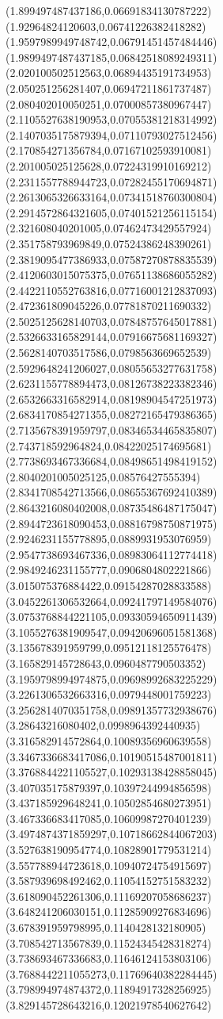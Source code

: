 {(1.899497487437186,0.06691834130787222)
(1.92964824120603,0.06741226382418282)
(1.9597989949748742,0.06791451457484446)
(1.9899497487437185,0.06842518089249311)
(2.020100502512563,0.06894435191734953)
(2.050251256281407,0.06947211861737487)
(2.080402010050251,0.07000857380967447)
(2.1105527638190953,0.07055381218314992)
(2.1407035175879394,0.07110793027512456)
(2.170854271356784,0.07167102593910081)
(2.201005025125628,0.07224319910169212)
(2.2311557788944723,0.07282455170694871)
(2.2613065326633164,0.07341518760300804)
(2.2914572864321605,0.07401521256115154)
(2.321608040201005,0.07462473429557924)
(2.351758793969849,0.07524386248390261)
(2.3819095477386933,0.07587270878835539)
(2.4120603015075375,0.07651138686055282)
(2.4422110552763816,0.07716001212837093)
(2.472361809045226,0.07781870211690332)
(2.5025125628140703,0.07848757645017881)
(2.5326633165829144,0.07916675681169327)
(2.5628140703517586,0.0798563669652539)
(2.5929648241206027,0.08055653277631758)
(2.6231155778894473,0.08126738223382346)
(2.6532663316582914,0.08198904547251973)
(2.6834170854271355,0.08272165479386365)
(2.7135678391959797,0.08346534465835807)
(2.743718592964824,0.08422025174695681)
(2.7738693467336684,0.08498651498419152)
(2.8040201005025125,0.08576427555394)
(2.8341708542713566,0.08655367692410389)
(2.8643216080402008,0.08735486487175047)
(2.8944723618090453,0.08816798750871975)
(2.9246231155778895,0.0889931953076959)
(2.9547738693467336,0.08983064112774418)
(2.9849246231155777,0.0906804802221866)
(3.015075376884422,0.09154287028833588)
(3.0452261306532664,0.09241797149584076)
(3.0753768844221105,0.09330594650911439)
(3.1055276381909547,0.09420696051581368)
(3.135678391959799,0.09512118125576478)
(3.165829145728643,0.0960487790503352)
(3.1959798994974875,0.09698992683225229)
(3.2261306532663316,0.0979448001759223)
(3.2562814070351758,0.09891357732938676)
(3.28643216080402,0.0998964392440935)
(3.316582914572864,0.10089356960639558)
(3.3467336683417086,0.10190515487001811)
(3.3768844221105527,0.10293138428858045)
(3.407035175879397,0.10397244994856598)
(3.437185929648241,0.10502854680273951)
(3.467336683417085,0.10609987270401239)
(3.4974874371859297,0.10718662844067203)
(3.527638190954774,0.10828901779531214)
(3.557788944723618,0.10940724754915697)
(3.587939698492462,0.11054152751583232)
(3.618090452261306,0.11169207058686237)
(3.648241206030151,0.11285909276834696)
(3.678391959798995,0.1140428132180905)
(3.708542713567839,0.11524345428318274)
(3.738693467336683,0.11646124153803106)
(3.7688442211055273,0.11769640382284445)
(3.798994974874372,0.11894917328256925)
(3.829145728643216,0.12021978540627642)
}

